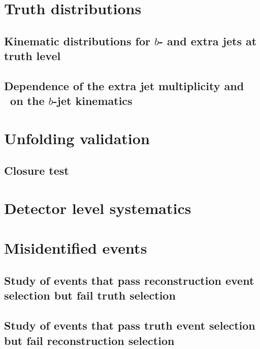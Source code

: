 \documentclass[12pt]{ucbthesis}
\begin{document}
\section{Truth distributions}
\subsection{Kinematic distributions for $b$- and extra jets at truth level}
\label{app:truth}
%
\subsection{Dependence of the extra jet multiplicity and \pt\ on the $b$-jet kinematics}
\label{app:bpt}
%
\section{Unfolding validation}
\label{app:unfoldval}

\subsection{Closure test}
\label{app:unfoldpull}
% 
% 
% 
%

%
\section{Detector level systematics}
\label{app:sys}
%
\section{Misidentified events}
\subsection{Study of  events that pass reconstruction event selection but fail truth selection}
\label{app:reconottruth}
%
\subsection{Study of events that pass truth event selection but fail reconstruction selection}
\label{app:truthnotreco}
%
\end{document}
